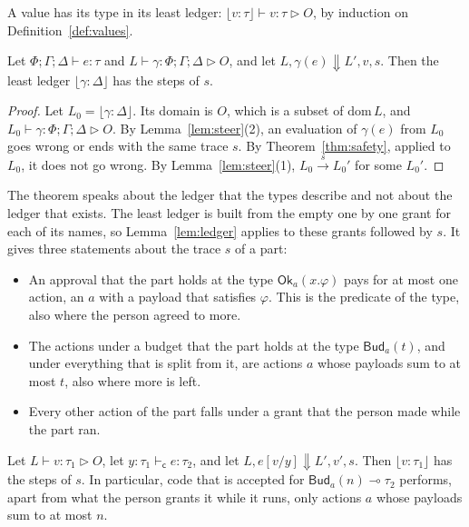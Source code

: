 \documentclass[acmsmall,nonacm,screen]{acmart}
\newcommand{\kw}[1]{\mathsf{#1}}
\newcommand{\Ok}[2]{\kw{Ok}_{#1}(#2)}
\newcommand{\Bud}[2]{\kw{Bud}_{#1}(#2)}
\newcommand{\dom}{\mathrm{dom}\,}
\newcommand{\evto}{\Downarrow}
\newcommand{\lstep}[1]{\xrightarrow{\,#1\,}}
\newcommand{\own}{\mathrel{\triangleright}}
\newcommand{\least}[2]{\lfloor #1 : #2 \rfloor}
\newcommand{\code}{\kw{c}}
\begin{document}
A value has its type in its least ledger: $\least{v}{\tau} \vdash v : \tau \own O$, by
induction on Definition~\ref{def:values}.

\begin{theorem}[Authority]
\label{thm:authority}
Let $\Phi; \Gamma; \Delta \vdash e : \tau$ and $L \vdash \gamma : \Phi; \Gamma; \Delta \own O$,
and let $L, \gamma(e) \evto L', v, s$. Then the least ledger $\least{\gamma}{\Delta}$ has the
steps of $s$.
\end{theorem}

\begin{proof}
Let $L_0 = \least{\gamma}{\Delta}$. Its domain is $O$, which is a subset of $\dom L$, and
$L_0 \vdash \gamma : \Phi; \Gamma; \Delta \own O$. By Lemma~\ref{lem:steer}(2), an evaluation
of $\gamma(e)$ from $L_0$ goes wrong or ends with the same trace $s$. By
Theorem~\ref{thm:safety}, applied to $L_0$, it does not go wrong. By
Lemma~\ref{lem:steer}(1), $L_0 \lstep{s} L_0'$ for some $L_0'$.
\end{proof}

The theorem speaks about the ledger that the types describe and not about the ledger that
exists. The least ledger is built from the empty one by one grant for each of its names, so
Lemma~\ref{lem:ledger} applies to these grants followed by $s$. It gives three statements about
the trace $s$ of a part:
\begin{itemize}
\item An approval that the part holds at the type $\Ok{a}{x.\varphi}$ pays for at most one
  action, an $a$ with a payload that satisfies $\varphi$. This is the predicate of the type,
  also where the person agreed to more.
\item The actions under a budget that the part holds at the type $\Bud{a}{t}$, and under
  everything that is split from it, are actions $a$ whose payloads sum to at most $t$, also
  where more is left.
\item Every other action of the part falls under a grant that the person made while the part
  ran.
\end{itemize}

\begin{corollary}
\label{cor:code}
Let $L \vdash v : \tau_1 \own O$, let $y{:}\tau_1 \vdash_{\code} e : \tau_2$, and let
$L, e[v/y] \evto L', v', s$. Then $\least{v}{\tau_1}$ has the steps of $s$. In particular, code
that is accepted for $\Bud{a}{n} \multimap \tau_2$ performs, apart from what the person grants
it while it runs, only actions $a$ whose payloads sum to at most $n$.
\end{corollary}
\end{document}
